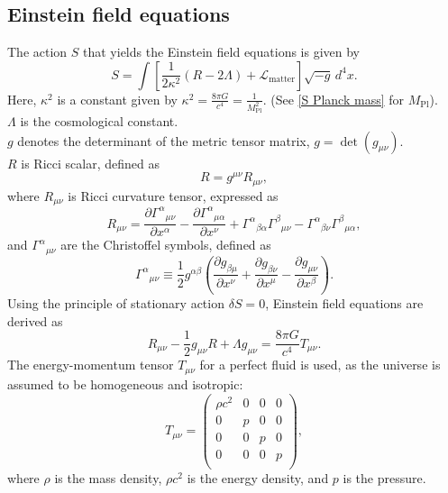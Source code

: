 \documentclass[12pt]{article}
\numberwithin{equation}{section}
\begin{document}
\subsection{Einstein field equations}
The action $S$ that yields the Einstein field equations is given by
\begin{equation}\label{EFTA}
    S = \int \left[ \frac{1}{2\kappa^2}\left( R - 2\Lambda \right) + \mathcal{L}_{\textrm{matter}} \right]\sqrt{-g}\, d^4x.
\end{equation}
Here, $\kappa^2$ is a constant given by $\kappa^2 = \displaystyle \frac{8\pi G}{c^4} = \frac{1}{M_{\textrm{Pl}}^2}$. (See \eqref{S Planck mass} for $M_{\textrm{Pl}}$).\\
$\Lambda$ is the cosmological constant.\\
$g$ denotes the determinant of the metric tensor matrix, $g = \det(g_{\mu\nu})$.\\
$R$ is Ricci scalar, defined as
\begin{equation}\label{Ricci scalar def}
    R = g^{\mu\nu}R_{\mu\nu},
\end{equation}
where $R_{\mu\nu}$ is Ricci curvature tensor,  expressed as
\begin{equation}\label{Ricci tensor def}
    R_{\mu\nu} = \frac{\partial{\Gamma^{\alpha}}_{\mu\nu}}{\partial x^\alpha} - \frac{\partial{\Gamma^{\alpha}}_{\mu\alpha}}{\partial x^\nu} + {\Gamma^{\alpha}}_{\beta\alpha}{\Gamma^{\beta}}_{\mu\nu} - {\Gamma^{\alpha}}_{\beta\nu}{\Gamma^{\beta}}_{\mu\alpha},
\end{equation}
and ${\Gamma^{\alpha}}_{\mu\nu}$ are the Christoffel symbols, defined as
\begin{equation}\label{Christoffel def}
    {\Gamma^{\alpha}}_{\mu\nu} \equiv \frac{1}{2}g^{\alpha\beta}\left( \frac{\partial g_{\beta\mu}}{\partial x^\nu} + \frac{\partial g_{\beta\nu}}{\partial x^\mu} - \frac{\partial g_{\mu\nu}}{\partial x^\beta} \right).
\end{equation}
Using the principle of stationary action $\delta S = 0$, Einstein field equations are derived as
\begin{equation}\label{EFE}
    R_{\mu\nu} -\frac{1}{2}g_{\mu\nu}R + \Lambda g_{\mu\nu}= \frac{8\pi G}{c^4}T_{\mu\nu}.
\end{equation}
The energy-momentum tensor $T_{\mu\nu}$ for a perfect fluid is used, as the universe is assumed to be homogeneous and isotropic:
\begin{equation}\label{EMT of pfluid}
    T_{\mu\nu} = \begin{pmatrix}
        \rho c^2 & 0 & 0 & 0\\
        0 & p & 0 & 0\\
        0 & 0 & p & 0\\
        0 & 0 & 0 & p\\
    \end{pmatrix},
\end{equation}
where $\rho$ is the mass density, $\rho c^2$ is the energy density, and $p$ is the pressure.
\end{document}
